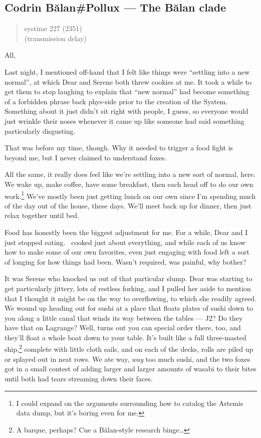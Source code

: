\hypertarget{codrin-bux103lanpollux-the-bux103lan-clade}{%
\subsection{Codrin Bălan\#Pollux — The Bălan clade}\label{codrin-bux103lanpollux-the-bux103lan-clade}}

\begin{quote}
systime 227 (2351)\\
(transmission delay)
\end{quote}

All,

Last night, I mentioned off-hand that I felt like things were ``settling into a new normal'', at which Dear and Serene both threw cookies at me. It took a while to get them to stop laughing to explain that ``new normal'' had become something of a forbidden phrase back phys-side prior to the creation of the System. Something about it just didn't sit right with people, I guess, so everyone would just wrinkle their noses whenever it came up like someone had said something particularly disgusting.

That was before my time, though. Why it needed to trigger a food fight is beyond me, but I never claimed to understand foxes.

All the same, it really does feel like we're settling into a new sort of normal, here. We wake up, make coffee, have some breakfast, then each head off to do our own work.\footnote{I could expand on the arguments surrounding how to catalog the Artemis data dump, but it's boring even for me.} We've mostly been just getting lunch on our own since I'm spending much of the day out of the house, these days. We'll meet back up for dinner, then just relax together until bed.

Food has honestly been the biggest adjustment for me. For a while, Dear and I just stopped eating. \Partner\ cooked just about everything, and while each of us know how to make some of our own favorites, even just engaging with food left a sort of longing for how things had been. Wasn't required, was painful, why bother?

It was Serene who knocked us out of that particular slump. Dear was starting to get particularly jittery, lots of restless forking, and I pulled her aside to mention that I thought it might be on the way to overflowing, to which she readily agreed. We wound up heading out for sushi at a place that floats plates of sushi down to you along a little canal that winds its way between the tables — J2? Do they have that on Lagrange? Well, turns out you can special order there, too, and they'll float a whole boat down to your table. It's built like a full three-masted ship,\footnote{A barque, perhaps? Cue a Bălan-style research binge\ldots{}} complete with little cloth sails, and on each of the decks, rolls are piled up or splayed out in neat rows. We ate way, \emph{way} too much sushi, and the two foxes got in a small contest of adding larger and larger amounts of wasabi to their bites until both had tears streaming down their faces.

